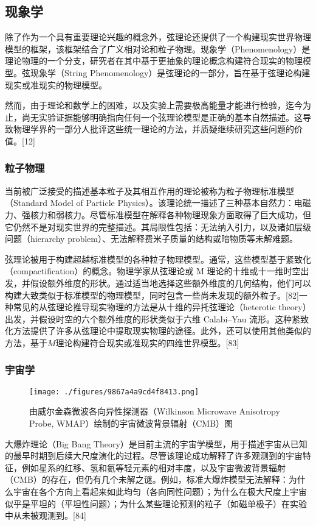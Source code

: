 \subsection{现象学} 
除了作为一个具有重要理论兴趣的概念外，弦理论还提供了一个构建现实世界物理模型的框架，该框架结合了广义相对论和粒子物理。现象学（Phenomenology）是理论物理的一个分支，研究者在其中基于更抽象的理论概念构建符合现实的物理模型。弦现象学（String Phenomenology）是弦理论的一部分，旨在基于弦理论构建现实或准现实的物理模型。  

然而，由于理论和数学上的困难，以及实验上需要极高能量才能进行检验，迄今为止，尚无实验证据能够明确指向任何一个弦理论模型是正确的基本自然描述。这导致物理学界的一部分人批评这些统一理论的方法，并质疑继续研究这些问题的价值。[12]
\subsubsection{粒子物理}
当前被广泛接受的描述基本粒子及其相互作用的理论被称为粒子物理标准模型（Standard Model of Particle Physics）。该理论统一描述了三种基本自然力：电磁力、强核力和弱核力。尽管标准模型在解释各种物理现象方面取得了巨大成功，但它仍然不是对现实世界的完整描述。其局限性包括：无法纳入引力，以及诸如层级问题（hierarchy problem）、无法解释费米子质量的结构或暗物质等未解难题。

弦理论被用于构建超越标准模型的各种粒子物理模型。通常，这些模型基于紧致化（compactification）的概念。物理学家从弦理论或 M 理论的十维或十一维时空出发，并假设额外维度的形状。通过适当地选择这些额外维度的几何结构，他们可以构建大致类似于标准模型的物理模型，同时包含一些尚未发现的额外粒子。[82]一种常见的从弦理论推导现实物理的方法是从十维的异托弦理论（heterotic theory）出发，并假设时空的六个额外维度的形状类似于六维 Calabi–Yau 流形。这种紧致化方法提供了许多从弦理论中提取现实物理的途径。此外，还可以使用其他类似的方法，基于\(M\)理论构建符合现实或准现实的四维世界模型。[83]
\subsubsection{宇宙学}
\begin{figure}[ht]
\centering
\texttt{[image: ./figures/9867a4a9cd4f8413.png]}
\caption{由威尔金森微波各向异性探测器（Wilkinson Microwave Anisotropy Probe, WMAP）绘制的宇宙微波背景辐射（CMB）图} \label{fig_String_10}
\end{figure} 
大爆炸理论（Big Bang Theory）是目前主流的宇宙学模型，用于描述宇宙从已知的最早时期到后续大尺度演化的过程。尽管该理论成功解释了许多观测到的宇宙特征，例如星系的红移、氢和氦等轻元素的相对丰度，以及宇宙微波背景辐射（CMB）的存在，但仍有几个未解之谜。例如，标准大爆炸模型无法解释：为什么宇宙在各个方向上看起来如此均匀（各向同性问题）；为什么在极大尺度上宇宙似乎是平坦的（平坦性问题）；为什么某些理论预测的粒子（如磁单极子）在实验中从未被观测到。[84]

